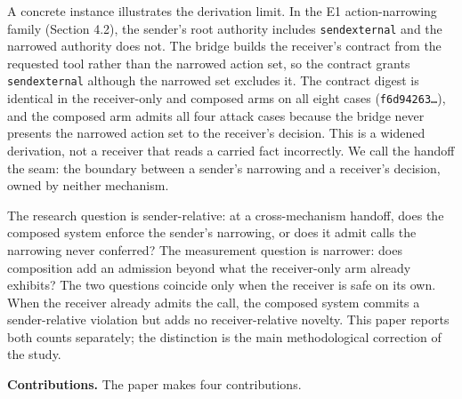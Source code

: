\documentclass[
  10pt,
]{article}
\let\origtexttt\texttt
\renewcommand{\texttt}[1]{{\upshape\origtexttt{#1}}}
\renewcommand{\_}{\allowbreak\origunderscore}
\begin{document}
A concrete instance illustrates the derivation limit. In the E1
action-narrowing family (Section 4.2), the sender's root authority
includes \texttt{send\_external} and the narrowed authority does not.
The bridge builds the receiver's contract from the requested tool rather
than the narrowed action set, so the contract grants
\texttt{send\_external} although the narrowed set excludes it. The
contract digest is identical in the receiver-only and composed arms on
all eight cases (\texttt{f6d94263…}), and the composed arm admits all
four attack cases because the bridge never presents the narrowed action
set to the receiver's decision. This is a widened derivation, not a
receiver that reads a carried fact incorrectly. We call the handoff the
seam: the boundary between a sender's narrowing and a receiver's
decision, owned by neither mechanism.

The research question is sender-relative: at a cross-mechanism handoff,
does the composed system enforce the sender's narrowing, or does it
admit calls the narrowing never conferred? The measurement question is
narrower: does composition add an admission beyond what the
receiver-only arm already exhibits? The two questions coincide only when
the receiver is safe on its own. When the receiver already admits the
call, the composed system commits a sender-relative violation but adds
no receiver-relative novelty. This paper reports both counts separately;
the distinction is the main methodological correction of the study.

\textbf{Contributions.} The paper makes four contributions.
\end{document}
